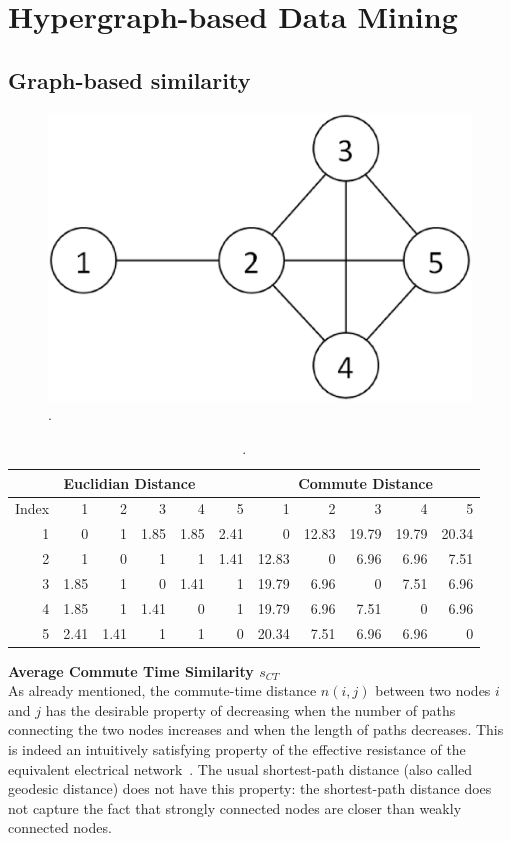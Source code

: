 \section{Hypergraph-based Data Mining}
\subsection{Graph-based similarity}
\begin{figure}[tbh]
\centering
\includegraphics[width=.4\textwidth]{fig/comm-dist-demo.eps}
\caption{\label{fig:comm-dist-demo} .}
\end{figure}

\begin{table}[ht]
\begin{tabular}{r|r|r|r|r|r || r|r|r|r|r}
\hline\hline
\multicolumn{6}{c||}{Euclidian Distance}	&	\multicolumn{5}{c}{Commute Distance}		\\
\hline\hline							
Index	&	1	&	2	&	3	&	4	&	5	&	1	&	2	&	3	&	4	&	5	\\
\hline
1	&	0	&	1	&	1.85	&	1.85	&	2.41	&	0	&	12.83	&	19.79	&	19.79	&	20.34	\\
\hline
2	&	1	&	0	&	1	&	1	&	1.41	&	12.83	&	0	&	6.96	&	6.96	&	7.51	\\
\hline
3	&	1.85	&	1	&	0	&	1.41	&	1	&	19.79	&	6.96	&	0	&	7.51	&	6.96	\\
\hline
4	&	1.85	&	1	&	1.41	&	0	&	1	&	19.79	&	6.96	&	7.51	&	0	&	6.96	\\
\hline
5	&	2.41	&	1.41	&	1	&	1	&	0	&	20.34	&	7.51	&	6.96	&	6.96	&	0	\\
\hline\hline
\end{tabular}
\caption{\label{tbl:comp-eucl-comm} .}
\end{table}
\textbf{Average Commute Time Similarity $s_{CT}$}\\

As already mentioned, the commute-time distance $n(i,j)$ between two nodes $i$ and $j$ has the desirable property of decreasing when the number of paths connecting the two nodes increases and when the length of paths decreases. This is indeed an intuitively satisfying property of the effective resistance of the equivalent electrical network~\cite{Doyle}. The usual shortest-path distance (also called geodesic distance) does not have this property: the shortest-path distance does not capture the fact that strongly connected nodes are closer than weakly connected nodes.

